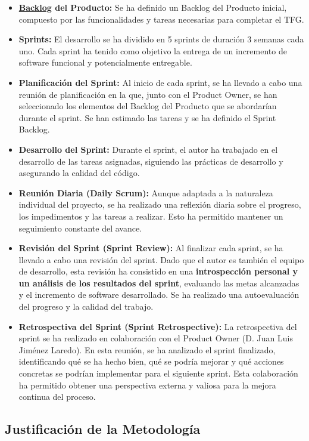 \begin{itemize}
    \item \textbf{\hyperlink{backlog}{Backlog} del Producto:} Se ha definido un Backlog del Producto inicial, compuesto por las funcionalidades y tareas necesarias para completar el TFG.
    \item \textbf{Sprints:} El desarrollo se ha dividido en 5 sprints de duración 3 semanas cada uno. Cada sprint ha tenido como objetivo la entrega de un incremento de software funcional y potencialmente entregable.
    \item \textbf{Planificación del Sprint:} Al inicio de cada sprint, se ha llevado a cabo una reunión de planificación en la que, junto con el Product Owner, se han seleccionado los elementos del Backlog del Producto que se abordarían durante el sprint. Se han estimado las tareas y se ha definido el Sprint Backlog.
    \item \textbf{Desarrollo del Sprint:} Durante el sprint, el autor ha trabajado en el desarrollo de las tareas asignadas, siguiendo las prácticas de desarrollo y asegurando la calidad del código.
    \item \textbf{Reunión Diaria (Daily Scrum):} Aunque adaptada a la naturaleza individual del proyecto, se ha realizado una reflexión diaria sobre el progreso, los impedimentos y las tareas a realizar. Esto ha permitido mantener un seguimiento constante del avance.
    \item \textbf{Revisión del Sprint (Sprint Review):} Al finalizar cada sprint, se ha llevado a cabo una revisión del sprint. Dado que el autor es también el equipo de desarrollo, esta revisión ha consistido en una \textbf{introspección personal y un análisis de los resultados del sprint}, evaluando las metas alcanzadas y el incremento de software desarrollado. Se ha realizado una autoevaluación del progreso y la calidad del trabajo.
    \item \textbf{Retrospectiva del Sprint (Sprint Retrospective):} La retrospectiva del sprint se ha realizado en colaboración con el Product Owner (D. Juan Luis Jiménez Laredo). En esta reunión, se ha analizado el sprint finalizado, identificando qué se ha hecho bien, qué se podría mejorar y qué acciones concretas se podrían implementar para el siguiente sprint. Esta colaboración ha permitido obtener una perspectiva externa y valiosa para la mejora continua del proceso.
\end{itemize}

\subsection{Justificación de la Metodología}

